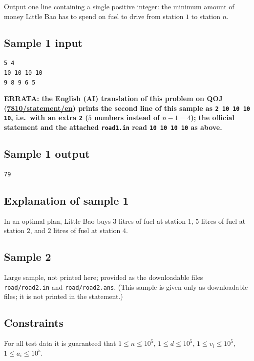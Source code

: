 \documentclass[11pt]{article}
\begin{document}
Output one line containing a single positive integer:
the minimum amount of money Little Bao has to spend on fuel to drive from
station $1$ to station $n$.

\subsection*{Sample 1 input}

\begin{verbatim}
5 4
10 10 10 10
9 8 9 6 5
\end{verbatim}

\noindent\textbf{ERRATA: the English (AI) translation of this problem on QOJ
(\href{https://qoj.ac/problem/7810/statement/en}{7810/statement/en}) prints the
second line of this sample as \texttt{2 10 10 10 10}, i.e.\ with an extra
\texttt{2} ($5$ numbers instead of $n-1=4$); the official statement and the
attached \texttt{road1.in} read \texttt{10 10 10 10} as above.}

\subsection*{Sample 1 output}

\begin{verbatim}
79
\end{verbatim}

\subsection*{Explanation of sample 1}

In an optimal plan, Little Bao buys $3$ litres of fuel at station $1$,
$5$ litres of fuel at station $2$, and $2$ litres of fuel at station $4$.

\subsection*{Sample 2}

Large sample, not printed here;
provided as the downloadable files \texttt{road/road2.in} and \texttt{road/road2.ans}.
(This sample is given only as downloadable files; it is not printed in the
statement.)

\subsection*{Constraints}

For all test data it is guaranteed that
$1 \le n \le 10^5$, $1 \le d \le 10^5$, $1 \le v_i \le 10^5$,
$1 \le a_i \le 10^5$.
\end{document}
